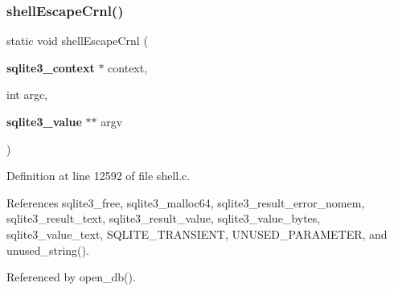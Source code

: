 \subsubsection{shell\+Escape\+Crnl()}
{\footnotesize\ttfamily static void shell\+Escape\+Crnl (\begin{DoxyParamCaption}\item[{\textbf{ sqlite3\+\_\+context} $\ast$}]{context,  }\item[{int}]{argc,  }\item[{\textbf{ sqlite3\+\_\+value} $\ast$$\ast$}]{argv }\end{DoxyParamCaption})\hspace{0.3cm}{\ttfamily [static]}}



Definition at line 12592 of file shell.\+c.



References sqlite3\+\_\+free, sqlite3\+\_\+malloc64, sqlite3\+\_\+result\+\_\+error\+\_\+nomem, sqlite3\+\_\+result\+\_\+text, sqlite3\+\_\+result\+\_\+value, sqlite3\+\_\+value\+\_\+bytes, sqlite3\+\_\+value\+\_\+text, S\+Q\+L\+I\+T\+E\+\_\+\+T\+R\+A\+N\+S\+I\+E\+NT, U\+N\+U\+S\+E\+D\+\_\+\+P\+A\+R\+A\+M\+E\+T\+ER, and unused\+\_\+string().



Referenced by open\+\_\+db().


